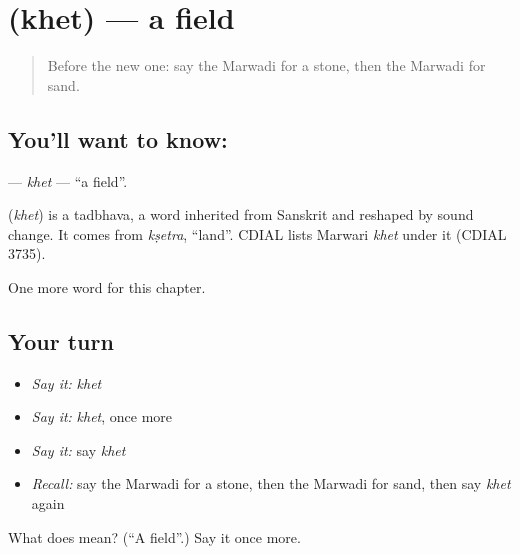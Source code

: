 \section[\texorpdfstring{\mw{खेत} (khet)}{खेत (khet)}]{ (khet) — a field}

\label{lesson:MW-C68-khet}



\begin{quote}
Before the new one: say the Marwadi for a stone, then the Marwadi for sand.
\end{quote}

\subsection*{You'll want to know: }
\textbf{} — \emph{khet} — \textquotedblleft{}a field\textquotedblright{}.

\begin{cousinweb}
\textbf{} (\emph{khet}) is a tadbhava, a word inherited from Sanskrit and reshaped by sound change. It comes from \emph{kṣetra}, \textquotedblleft{}land\textquotedblright{}. CDIAL lists Marwari \emph{khet} under it (CDIAL 3735).
\end{cousinweb}

\begin{grammarlens}[title={What you've built}]
One more word for this chapter.
\end{grammarlens}

\subsection*{Your turn}
\begin{itemize}
\raggedright
  \item \emph{Say it:} \emph{khet}
  \item \emph{Say it:} \emph{khet}, once more
  \item \emph{Say it:} say \emph{khet}
  \item \emph{Recall:} say the Marwadi for a stone, then the Marwadi for sand, then say \emph{khet} again
\end{itemize}

\begin{tcolorbox}[breakable,colback=teal!4,colframe=teal!35!black,title={Before you move on}]
What does  mean? (\textquotedblleft{}A field\textquotedblright{}.) Say it once more.
\end{tcolorbox}
